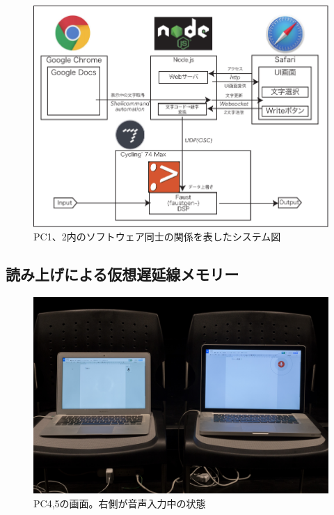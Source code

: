 \documentclass[a4paper,report]{jsbook}
\begin{document}
\begin{figure}[htbp]
\centering
\includegraphics[width=1.00000\textwidth]{./img/admpart_diagram.pdf}
\caption{PC1、2内のソフトウェア同士の関係を表したシステム図\label{fig:writer_system}}
\end{figure}

\subsection{読み上げによる仮想遅延線メモリー}\label{ux8aadux307fux4e0aux3052ux306bux3088ux308bux4eeeux60f3ux9045ux5ef6ux7ddaux30e1ux30e2ux30eaux30fc}

\begin{no-prefix-figure-caption}

\begin{figure}[htbp]
\centering
\includegraphics[width=1.00000\textwidth]{./img/adm2_archive2.jpg}
\caption{PC4,5の画面。右側が音声入力中の状態}
\end{figure}

\end{no-prefix-figure-caption}
\end{document}
